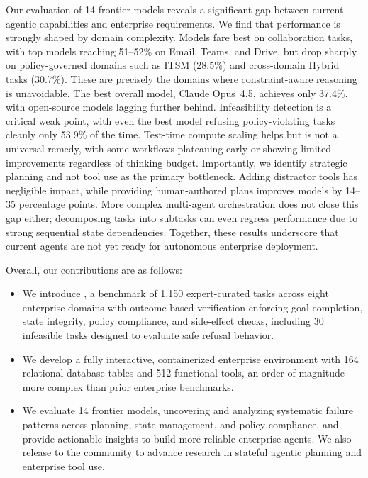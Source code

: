 Our evaluation of 14 frontier models reveals a significant gap between current agentic capabilities and enterprise requirements. We find that performance is strongly shaped by domain complexity. Models fare best on collaboration tasks, with top models reaching 51--52\% on Email, Teams, and Drive, but drop sharply on policy-governed domains such as ITSM (28.5\%) and cross-domain Hybrid tasks (30.7\%). These are precisely the domains where constraint-aware reasoning is unavoidable. The best overall model, Claude Opus~4.5, achieves only 37.4\%, with open-source models lagging further behind. Infeasibility detection is a critical weak point, with even the best model refusing policy-violating tasks cleanly only 53.9\% of the time. Test-time compute scaling helps but is not a universal remedy, with some workflows plateauing early or showing limited improvements regardless of thinking budget. Importantly, we identify strategic planning and not tool use as the primary bottleneck. Adding distractor tools has negligible impact, while providing human-authored plans improves models by 14--35 percentage points. More complex multi-agent orchestration does not close this gap either; decomposing tasks into subtasks can even regress performance due to strong sequential state dependencies. Together, these results underscore that current agents are not yet ready for autonomous enterprise deployment.

Overall, our contributions are as follows:
\begin{itemize}
    \item We introduce \ours{}, a benchmark of 1,150 expert-curated tasks across eight enterprise domains with outcome-based verification enforcing goal completion, state integrity, policy compliance, and side-effect checks, including 30 infeasible tasks designed to evaluate safe refusal behavior.
    \item We develop a fully interactive, containerized enterprise environment with 164 relational database tables and 512 functional tools, an order of magnitude more complex than prior enterprise benchmarks.
    \item We evaluate 14 frontier models, uncovering and analyzing systematic failure patterns across planning, state management, and policy compliance, and provide actionable insights to build more reliable enterprise agents. We also release \ours{} to the community to advance research in stateful agentic planning and enterprise tool use.
\end{itemize}